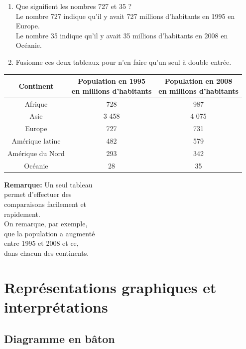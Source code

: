 \documentclass[12pt,a4paper]{article}
\begin{document}
\begin{enumerate}[label=\textbf{\alph*.}]
\item Que signifient les nombres 727 et 35 ? \\
Le nombre  727  indique qu'il y avait 727 millions d'habitants en 1995 en Europe.\\
Le nombre  35  indique qu'il y avait 35 millions d'habitants en 2008 en Océanie.
\item Fusionne ces deux tableaux pour n'en faire qu'un seul à double entrée.
\end{enumerate}

\begin{vwcol}[widths={0.7, 0.2}]
\begin{tabular}{|c|c|c|}
\hline \rowcolor{lightgray}
Continent & \thead{Population en 1995\\en millions d'habitants}& \thead{Population en 2008\\en millions d'habitants} \\ \hline
Afrique & 728 & 987 \\ \hline
Asie & 3 458 & 4 075 \\ \hline
Europe & 727 & 731 \\ \hline
Amérique latine & 482 & 579 \\ \hline
Amérique du Nord & 293 & 342 \\ \hline
Océanie & 28 & 35 \\ \hline
\end{tabular}

\textbf{Remarque:} Un seul tableau\\
permet d'effectuer des \\
comparaisons facilement et \\
rapidement.\\
On remarque, par exemple, \\
que la population a augmenté \\
entre 1995 et 2008 et ce, \\
dans chacun des continents.

\end{vwcol}

\section{Représentations graphiques et interprétations}

\subsection{Diagramme en bâton}
\end{document}
